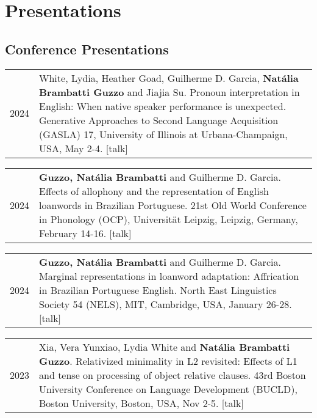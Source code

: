 \documentclass[letterpaper,10pt]{article}
\begin{document}
  
\vspace{0.3cm}
 
\section{Presentations}
 
\subsection*{Conference Presentations}


\begin{tabular}{p{1cm}p{16cm}}
2024 & White, Lydia, Heather Goad, Guilherme D. Garcia, \textbf{Nat\'alia Brambatti Guzzo} and Jiajia Su. Pronoun interpretation in English: When native speaker performance is unexpected. Generative Approaches to Second Language Acquisition (GASLA) 17, University of Illinois at Urbana-Champaign, USA, May 2-4. [talk]
\end{tabular}

\begin{tabular}{p{1cm}p{16cm}}
2024 & \textbf{Guzzo, Nat\'alia Brambatti} and Guilherme D. Garcia. Effects of allophony and the representation of English loanwords in Brazilian Portuguese. 21st Old World Conference in Phonology (OCP), Universit\"at Leipzig, Leipzig, Germany, February 14-16. [talk]
\end{tabular}

\begin{tabular}{p{1cm}p{16cm}}
2024 & \textbf{Guzzo, Nat\'alia Brambatti} and Guilherme D. Garcia. Marginal representations in loanword adaptation: Affrication in Brazilian Portuguese English. North East Linguistics Society 54 (NELS), MIT, Cambridge, USA, January 26-28. [talk]
\end{tabular}

\begin{tabular}{p{1cm}p{16cm}}
2023 & Xia, Vera Yunxiao, Lydia White and \textbf{Nat\'alia Brambatti Guzzo}. Relativized minimality in L2 revisited: Effects of L1 and tense on processing of object relative clauses. 43rd Boston University Conference on Language Development (BUCLD), Boston University, Boston, USA, Nov 2-5. [talk]
\end{tabular}
\end{document}
